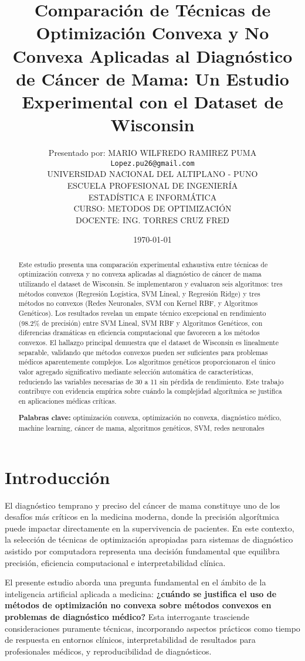 \documentclass[12pt,a4paper]{article}
\title{\textbf{Comparación de Técnicas de Optimización Convexa y No Convexa Aplicadas al Diagnóstico de Cáncer de Mama: Un Estudio Experimental con el Dataset de Wisconsin}}
\author{Presentado por: MARIO WILFREDO RAMIREZ PUMA\\
\texttt{Lopez.pu26@gmail.com}\\
 UNIVERSIDAD NACIONAL DEL ALTIPLANO - PUNO\\
 ESCUELA PROFESIONAL DE INGENIERÍA \\
 ESTADÍSTICA E INFORMÁTICA\\
 CURSO: METODOS DE OPTIMIZACIÓN\\
DOCENTE: ING. TORRES CRUZ FRED\\}
\date{\today}
\begin{document}
\maketitle

\begin{abstract}
Este estudio presenta una comparación experimental exhaustiva entre técnicas de optimización convexa y no convexa aplicadas al diagnóstico de cáncer de mama utilizando el dataset de Wisconsin. Se implementaron y evaluaron seis algoritmos: tres métodos convexos (Regresión Logística, SVM Lineal, y Regresión Ridge) y tres métodos no convexos (Redes Neuronales, SVM con Kernel RBF, y Algoritmos Genéticos). Los resultados revelan un empate técnico excepcional en rendimiento (98.2\% de precisión) entre SVM Lineal, SVM RBF y Algoritmos Genéticos, con diferencias dramáticas en eficiencia computacional que favorecen a los métodos convexos. El hallazgo principal demuestra que el dataset de Wisconsin es linealmente separable, validando que métodos convexos pueden ser suficientes para problemas médicos aparentemente complejos. Los algoritmos genéticos proporcionaron el único valor agregado significativo mediante selección automática de características, reduciendo las variables necesarias de 30 a 11 sin pérdida de rendimiento. Este trabajo contribuye con evidencia empírica sobre cuándo la complejidad algorítmica se justifica en aplicaciones médicas críticas.

\textbf{Palabras clave:} optimización convexa, optimización no convexa, diagnóstico médico, machine learning, cáncer de mama, algoritmos genéticos, SVM, redes neuronales
\end{abstract}
\newpage
\tableofcontents
\newpage

\section{Introducción}

El diagnóstico temprano y preciso del cáncer de mama constituye uno de los desafíos más críticos en la medicina moderna, donde la precisión algorítmica puede impactar directamente en la supervivencia de pacientes. En este contexto, la selección de técnicas de optimización apropiadas para sistemas de diagnóstico asistido por computadora representa una decisión fundamental que equilibra precisión, eficiencia computacional e interpretabilidad clínica.

El presente estudio aborda una pregunta fundamental en el ámbito de la inteligencia artificial aplicada a medicina: \textbf{¿cuándo se justifica el uso de métodos de optimización no convexa sobre métodos convexos en problemas de diagnóstico médico?} Esta interrogante trasciende consideraciones puramente técnicas, incorporando aspectos prácticos como tiempo de respuesta en entornos clínicos, interpretabilidad de resultados para profesionales médicos, y reproducibilidad de diagnósticos.
\end{document}

